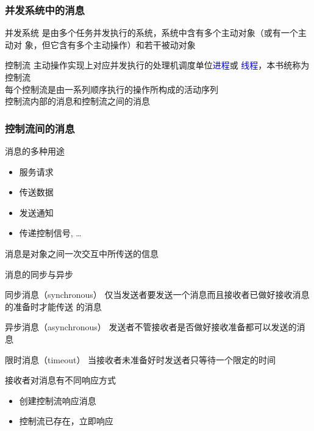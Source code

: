 \documentclass[compress]{beamer}
\begin{document}
\begin{frame}
  \frametitle{并发系统中的消息}
  \begin{block}{并发系统}
    是由多个任务并发执行的系统，系统中含有多个主动对象（或有一个主动对
    象，但它含有多个主动操作）和若干被动对象
  \end{block}
  \begin{block}{控制流}
    主动操作实现上对应并发执行的处理机调度单位\textcolor{blue}{进程}或
    \textcolor{blue}{线程}，本书统称为控制流\\
    每个控制流是由一系列顺序执行的操作所构成的活动序列 \\
    控制流内部的消息和控制流之间的消息
  \end{block}
\end{frame}

\begin{frame}
  \frametitle{控制流间的消息}
  \begin{itemize}
       {
    \item 消息的多种用途
      \begin{itemize}
        \item 服务请求
        \item 传送数据
        \item 发送通知
        \item 传递控制信号, \ldots
      \end{itemize}
      \begin{definition}
        消息是对象之间一次交互中所传送的信息
      \end{definition}
    }
     {
    \item 消息的同步与异步
      \begin{block}{同步消息（synchronous）}
        仅当发送者要发送一个消息而且接收者已做好接收消息的准备时才能传送
        的消息
      \end{block}
      \begin{block}{异步消息（asynchronous）}
        发送者不管接收者是否做好接收准备都可以发送的消息
      \end{block}
      \begin{block}{限时消息（timeout）}
        当接收者未准备好时发送者只等待一个限定的时间
      \end{block}
    }
     {
    \item 接收者对消息有不同响应方式
      \begin{itemize}
        \item 创建控制流响应消息
        \item 控制流已存在，立即响应

\end{itemize}}
\end{itemize}
\end{frame}
\end{document}
